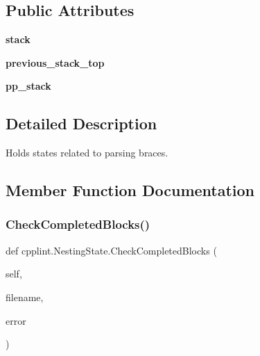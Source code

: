 \subsection*{Public Attributes}
\begin{DoxyCompactItemize}
\item 
\mbox{\label{classcpplint_1_1NestingState_a6ae9bea040f988d152922788d0d73a15}} 
{\bfseries stack}
\item 
\mbox{\label{classcpplint_1_1NestingState_a7aa34c8fb8df73d76f702c7012c46911}} 
{\bfseries previous\+\_\+stack\+\_\+top}
\item 
\mbox{\label{classcpplint_1_1NestingState_a3a5ca37e3066d91830ea1faa8feae4e5}} 
{\bfseries pp\+\_\+stack}
\end{DoxyCompactItemize}


\subsection{Detailed Description}
\begin{DoxyVerb}Holds states related to parsing braces.\end{DoxyVerb}
 

\subsection{Member Function Documentation}
\mbox{\label{classcpplint_1_1NestingState_a7bde5ab65152b4073763b1bd17cba567}} 
\subsubsection{\texorpdfstring{Check\+Completed\+Blocks()}{CheckCompletedBlocks()}}
{\footnotesize\ttfamily def cpplint.\+Nesting\+State.\+Check\+Completed\+Blocks (\begin{DoxyParamCaption}\item[{}]{self,  }\item[{}]{filename,  }\item[{}]{error }\end{DoxyParamCaption})}

